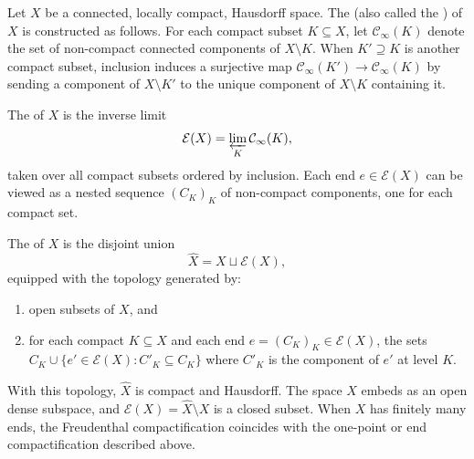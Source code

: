 \begin{definition} \label{definition:freudenthal_compactification}
    Let $X$ be a connected, locally compact, Hausdorff space. The  (also called the ) of $X$ is constructed as follows. For each compact subset $K \subseteq X$, let $\mathcal{C}_\infty(K)$ denote the set of non-compact connected components of $X \setminus K$. When $K' \supseteq K$ is another compact subset, inclusion induces a surjective map $\mathcal{C}_\infty(K') \to \mathcal{C}_\infty(K)$ by sending a component of $X \setminus K'$ to the unique component of $X \setminus K$ containing it.

    The  of $X$ is the inverse limit
    $$\mathcal{E}(X) = \varprojlim_{K} \mathcal{C}_\infty(K),$$
    taken over all compact subsets ordered by inclusion. Each end $e \in \mathcal{E}(X)$ can be viewed as a nested sequence $(C_K)_{K}$ of non-compact components, one for each compact set.

    The  of $X$ is the disjoint union
    $$\hat{X} = X \sqcup \mathcal{E}(X),$$
    equipped with the topology generated by:
    \begin{enumerate}
        \item open subsets of $X$, and
        \item for each compact $K \subseteq X$ and each end $e = (C_K)_K \in \mathcal{E}(X)$, the sets $C_K \cup \{e' \in \mathcal{E}(X) : C'_K \subseteq C_K\}$ where $C'_K$ is the component of $e'$ at level $K$.
    \end{enumerate}

    With this topology, $\hat{X}$ is compact and Hausdorff. The space $X$ embeds as an open dense subspace, and $\mathcal{E}(X) = \hat{X} \setminus X$ is a closed subset. When $X$ has finitely many ends, the Freudenthal compactification coincides with the one-point or end compactification described above.
\end{definition}
